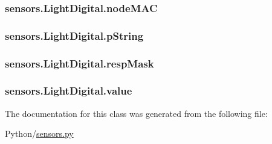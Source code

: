 \subsubsection[{\texorpdfstring{node\+M\+AC}{nodeMAC}}]{\setlength{\rightskip}{0pt plus 5cm}sensors.\+Light\+Digital.\+node\+M\+AC}\hypertarget{classsensors_1_1LightDigital_aff8ca45bed10fa813320e1c9d9c98629}{}\label{classsensors_1_1LightDigital_aff8ca45bed10fa813320e1c9d9c98629}
\subsubsection[{\texorpdfstring{p\+String}{pString}}]{\setlength{\rightskip}{0pt plus 5cm}sensors.\+Light\+Digital.\+p\+String}\hypertarget{classsensors_1_1LightDigital_a4006bea0c1d6a032afa6285c64ab3eb2}{}\label{classsensors_1_1LightDigital_a4006bea0c1d6a032afa6285c64ab3eb2}
\subsubsection[{\texorpdfstring{resp\+Mask}{respMask}}]{\setlength{\rightskip}{0pt plus 5cm}sensors.\+Light\+Digital.\+resp\+Mask}\hypertarget{classsensors_1_1LightDigital_a546ea9eee933df95e39666468fb110af}{}\label{classsensors_1_1LightDigital_a546ea9eee933df95e39666468fb110af}
\subsubsection[{\texorpdfstring{value}{value}}]{\setlength{\rightskip}{0pt plus 5cm}sensors.\+Light\+Digital.\+value}\hypertarget{classsensors_1_1LightDigital_ad801e3eae346e5661ce737ade49e6ac1}{}\label{classsensors_1_1LightDigital_ad801e3eae346e5661ce737ade49e6ac1}


The documentation for this class was generated from the following file\+:\begin{DoxyCompactItemize}
\item 
Python/\hyperlink{sensors_8py}{sensors.\+py}\end{DoxyCompactItemize}
